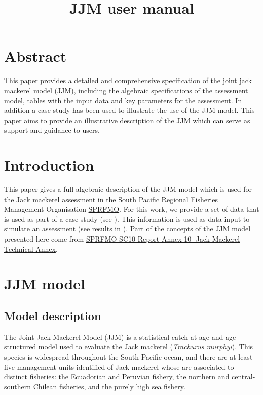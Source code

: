 \documentclass{article}
\title{JJM user manual}
\date{\parbox{\linewidth}{\centering%
  \skip
  Criscely LUJAN \hspace*{3cm} Mirian GERONIMO\endgraf\medskip
  Instituto del Mar del Perú IMARPE}
  }
\begin{document}
\maketitle

\tableofcontents
\newpage

\section*{Abstract} 
This paper provides a detailed and comprehensive specification of the joint jack mackerel model (JJM), including the algebraic specifications of the assessment model, tables with the input data and key parameters for the assessment. In addition a case study has been used to illustrate the use of the JJM model. This paper aims to provide an illustrative description of the JJM which can serve as support and guidance to users.

\section{Introduction} 

This paper gives a full algebraic description of the JJM model which is used for the Jack mackerel assessment in the South Pacific Regional Fisheries Management Organisation \href{https://www.sprfmo.int/}{SPRFMO}. For this work, we provide a set of data that is used as part of a case study (see ). This information is used as data input to simulate an assessment (see results in ). Part of the concepts of the JJM model presented here come from \href{https://www.sprfmo.int/assets/Meetings/SC/10th-SC-2022/Report-and-Annexes/Annex-8-JM-Technical-Advice-CV_2.pdf}{SPRFMO SC10 Report-Annex 10- Jack Mackerel Technical Annex}.

\section{JJM model}

\subsection{Model description}

The Joint Jack Mackerel Model (JJM) is a statistical catch-at-age and age-structured model used to evaluate the Jack mackerel (\textit{Trachurus murphyi}). This species is widespread throughout the South Pacific ocean, and there are at least five management units identified of Jack mackerel whose are associated to distinct fisheries: the Ecuadorian and Peruvian fishery, the northern and central-southern Chilean fisheries, and the purely high sea fishery. 
\end{document}
